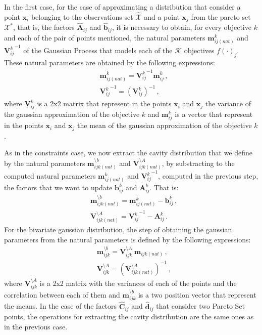 \documentclass[review,preprint,12pt]{elsarticle}
\begin{document}
In the first case, for the case of approximating a distribution that consider a point $\boldsymbol{x}_i$ belonging to the observations set $\hat{\mathcal{X}}$ and a point $\boldsymbol{x}_j$ from the pareto set $\mathcal{X}^*$, that is, the factors $\hat{\boldsymbol{A}}_{ij}$ and $\hat{\boldsymbol{b}}_{ij}$, it is necessary to obtain, for every objective $k$ and each of the pair of points mentioned, the natural parameters $\boldsymbol{m}_{ij(nat)}^{k}$ and ${\boldsymbol{V}_{ij}^{k}}^{-1}$ of the Gaussian Process that models each of the $\mathcal{K}$ objectives $f(\cdot)_j$.
These natural parameters are obtained by the following expressions:
\begin{align}
   & \boldsymbol{m}_{ij(nat)}^{k} = {\boldsymbol{V}_{ij}^{k}}^{-1}\boldsymbol{m}_{ij}^{k}\,, \nonumber \\
   & {\boldsymbol{V}_{ij}^{k}}^{-1} = (\boldsymbol{V}_{ij}^{k})^{-1}\,,
\end{align}
where $\boldsymbol{V}_{ij}^{k}$ is a 2x2 matrix that represent in the points $\boldsymbol{x}_i$ and $\boldsymbol{x}_j$ the variance of the gaussian approximation of the objective $k$ and $\boldsymbol{m}_{ij}^{k}$ is a vector that represent in the points $\boldsymbol{x}_i$ and $\boldsymbol{x}_j$ the mean of the gaussian approximation of the objective $k$.

As in the constraints case, we now extract the cavity distribution that we define by the natural parameters $\boldsymbol{m}_{ijk(nat)}^{\setminus b}$ and $\boldsymbol{V}_{ijk(nat)}^{\setminus A}$, by substracting to the computed natural parameters $\boldsymbol{m}_{ij(nat)}^{k}$ and ${\boldsymbol{V}_{ij}^{k}}^{-1}$, computed in the previous step, the factors that we want to update $\boldsymbol{b}_{ij}^{k}$ and $\boldsymbol{A}_{ij}^{k}$. That is:
\begin{align}
    & \boldsymbol{m}_{ijk(nat)}^{\setminus b} = \boldsymbol{m}_{ij(nat)}^{k} - \boldsymbol{b}_{ij}^{k}\,, \nonumber \\
    & \boldsymbol{V}_{ijk(nat)}^{\setminus A} = {\boldsymbol{V}_{ij}^{k}}^{-1} - \boldsymbol{A}_{ij}^{k}\,.
\end{align}
For the bivariate gaussian distribution, the step of obtaining the gaussian parameters from the natural parameters is defined by the following expressions:
\begin{align}
    & \boldsymbol{m}_{ijk}^{\setminus b} = \boldsymbol{V}_{ijk}^{\setminus A}\ \boldsymbol{m}_{ijk(nat)}\,, \nonumber \\
    & \boldsymbol{V}_{ijk}^{\setminus A} = (\boldsymbol{V}_{ijk(nat)}^{\setminus A})^{-1}\,,
\end{align}
where $\boldsymbol{V}_{ijk}^{\setminus A}$ is a 2x2 matrix with the variances of each of the points and the correlation between each of them and $\boldsymbol{m}_{ijk}^{\setminus b}$ is a two position vector that represent the means. In the case of the factors $\hat{\boldsymbol{C}}_{ij}$ and $\hat{\boldsymbol{d}}_{ij}$ that consider two Pareto Set points, the operations for extracting the cavity distribution are the same ones as in the previous case.
\end{document}
